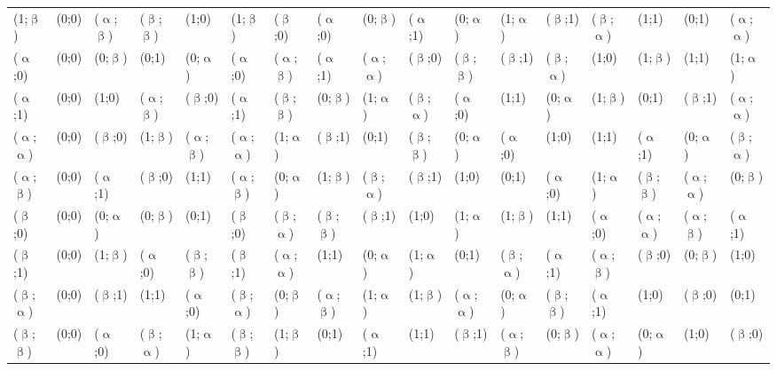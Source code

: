 \begin{table}[H]
\begin{changemargin}{-0.7cm}{-1cm}
\begin{tabular}{p{0.7cm}|p{0.5cm}p{0.5cm}p{0.5cm}p{0.5cm}p{0.5cm}p{0.5cm}p{0.5cm}p{0.5cm}p{0.5cm}p{0.5cm}p{0.5cm}p{0.5cm}p{0.5cm}p{0.5cm}p{0.5cm}p{0.5cm}}
(1;$\upbeta$) & (0;0) & ($\upalpha$;$\upbeta$) & ($\upbeta$;$\upbeta$) & (1;0) & (1;$\upbeta$) & ($\upbeta$;0) & ($\upalpha$;0) & (0;$\upbeta$) & ($\upalpha$;1) & (0;$\upalpha$) & (1;$\upalpha$) & ($\upbeta$;1) & ($\upbeta$;$\upalpha$) & (1;1) & (0;1) & ($\upalpha$;$\upalpha$) \\
($\upalpha$;0) & (0;0) & (0;$\upbeta$) & (0;1) & (0;$\upalpha$) & ($\upalpha$;0) & ($\upalpha$;$\upbeta$) & ($\upalpha$;1) & ($\upalpha$;$\upalpha$) & ($\upbeta$;0) & ($\upbeta$;$\upbeta$) & ($\upbeta$;1) & ($\upbeta$;$\upalpha$) & (1;0) & (1;$\upbeta$) & (1;1) & (1;$\upalpha$) \\
($\upalpha$;1) & (0;0) & (1;0) & ($\upalpha$;$\upbeta$) & ($\upbeta$;0) & ($\upalpha$;1) & ($\upbeta$;$\upbeta$) & (0;$\upbeta$) & (1;$\upalpha$) & ($\upbeta$;$\upalpha$) & ($\upalpha$;0) & (1;1) & (0;$\upalpha$) & (1;$\upbeta$) & (0;1) & ($\upbeta$;1) & ($\upalpha$;$\upalpha$) \\
($\upalpha$;$\upalpha$) & (0;0) & ($\upbeta$;0) & (1;$\upbeta$) & ($\upalpha$;$\upbeta$) & ($\upalpha$;$\upalpha$) & (1;$\upalpha$) & ($\upbeta$;1) & (0;1) & ($\upbeta$;$\upbeta$) & (0;$\upalpha$) & ($\upalpha$;0) & (1;0) & (1;1) & ($\upalpha$;1) & (0;$\upalpha$) & ($\upbeta$;$\upalpha$) \\
($\upalpha$;$\upbeta$) & (0;0) & ($\upalpha$;1) & ($\upbeta$;0) & (1;1) & ($\upalpha$;$\upbeta$) & (0;$\upalpha$) & (1;$\upbeta$) & ($\upbeta$;$\upalpha$) & ($\upbeta$;1) & (1;0) & (0;1) & ($\upalpha$;0) & (1;$\upalpha$) & ($\upbeta$;$\upbeta$) & ($\upalpha$;$\upalpha$) & (0;$\upbeta$) \\
($\upbeta$;0) & (0;0) & (0;$\upalpha$) & (0;$\upbeta$) & (0;1) & ($\upbeta$;0) & ($\upbeta$;$\upalpha$) & ($\upbeta$;$\upbeta$) & ($\upbeta$;1) & (1;0) & (1;$\upalpha$) & (1;$\upbeta$) & (1;1) & ($\upalpha$;0) & ($\upalpha$;$\upalpha$) & ($\upalpha$;$\upbeta$) & ($\upalpha$;1) \\
($\upbeta$;1) & (0;0) & (1;$\upbeta$) & ($\upalpha$;0) & ($\upbeta$;$\upbeta$) & ($\upbeta$;1) & ($\upalpha$;$\upalpha$) & (1;1) & (0;$\upalpha$) & (1;$\upalpha$) & (0;1) & ($\upbeta$;$\upalpha$) & ($\upalpha$;1) & ($\upalpha$;$\upbeta$) & ($\upbeta$;0) & (0;$\upbeta$) & (1;0) \\
($\upbeta$;$\upalpha$) & (0;0) & ($\upbeta$;1) & (1;1) & ($\upalpha$;0) & ($\upbeta$;$\upalpha$) & (0;$\upbeta$) & ($\upalpha$;$\upbeta$) & (1;$\upalpha$) & (1;$\upbeta$) & ($\upalpha$;$\upalpha$) & (0;$\upalpha$) & ($\upbeta$;$\upbeta$) & ($\upalpha$;1) & (1;0) & ($\upbeta$;0) & (0;1) \\
($\upbeta$;$\upbeta$) & (0;0) & ($\upalpha$;0) & ($\upbeta$;$\upalpha$) & (1;$\upalpha$) & ($\upbeta$;$\upbeta$) & (1;$\upbeta$) & (0;1) & ($\upalpha$;1) & (1;1) & ($\upbeta$;1) & ($\upalpha$;$\upbeta$) & (0;$\upbeta$) & ($\upalpha$;$\upalpha$) & (0;$\upalpha$) & (1;0) & ($\upbeta$;0)
\end{tabular}
\end{changemargin}
\end{table}
